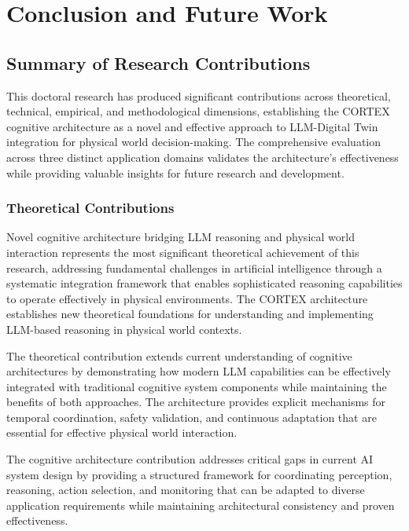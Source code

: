 
\chapter{Conclusion and Future Work} \label{chp:conclusion}


\section{Summary of Research Contributions}

This doctoral research has produced significant contributions across theoretical, technical, empirical, and methodological dimensions, establishing the CORTEX cognitive architecture as a novel and effective approach to LLM-Digital Twin integration for physical world decision-making. The comprehensive evaluation across three distinct application domains validates the architecture's effectiveness while providing valuable insights for future research and development.

\subsection{Theoretical Contributions}

Novel cognitive architecture bridging LLM reasoning and physical world interaction represents the most significant theoretical achievement of this research, addressing fundamental challenges in artificial intelligence through a systematic integration framework that enables sophisticated reasoning capabilities to operate effectively in physical environments. The CORTEX architecture establishes new theoretical foundations for understanding and implementing LLM-based reasoning in physical world contexts.

The theoretical contribution extends current understanding of cognitive architectures by demonstrating how modern LLM capabilities can be effectively integrated with traditional cognitive system components while maintaining the benefits of both approaches. The architecture provides explicit mechanisms for temporal coordination, safety validation, and continuous adaptation that are essential for effective physical world interaction.

The cognitive architecture contribution addresses critical gaps in current AI system design by providing a structured framework for coordinating perception, reasoning, action selection, and monitoring that can be adapted to diverse application requirements while maintaining architectural consistency and proven effectiveness.

